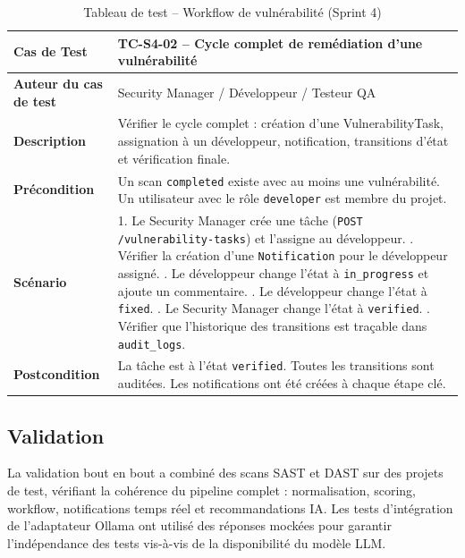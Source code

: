 \begin{table}[H]
\centering
\caption{Tableau de test -- Workflow de vulnérabilité (Sprint 4)}
\label{tab:test-sprint4-workflow}
\small
\renewcommand{\arraystretch}{1.3}
\begin{tabularx}{\textwidth}{>{\bfseries}p{3.5cm} X}
\hline
Cas de Test & TC-S4-02 -- Cycle complet de remédiation d'une vulnérabilité \\
\hline
Auteur du cas de test & Security Manager / Développeur / Testeur QA \\
\hline
Description & Vérifier le cycle complet : création d'une VulnerabilityTask, assignation à un développeur, notification, transitions d'état et vérification finale. \\
\hline
Précondition & Un scan \texttt{completed} existe avec au moins une vulnérabilité. Un utilisateur avec le rôle \texttt{developer} est membre du projet. \\
\hline
Scénario &
1. Le Security Manager crée une tâche (\texttt{POST /vulnerability-tasks}) et l'assigne au développeur. \newline
2. Vérifier la création d'une \texttt{Notification} pour le développeur assigné. \newline
3. Le développeur change l'état à \texttt{in\_progress} et ajoute un commentaire. \newline
4. Le développeur change l'état à \texttt{fixed}. \newline
5. Le Security Manager change l'état à \texttt{verified}. \newline
6. Vérifier que l'historique des transitions est traçable dans \texttt{audit\_logs}. \\
\hline
Postcondition & La tâche est à l'état \texttt{verified}. Toutes les transitions sont auditées. Les notifications ont été créées à chaque étape clé. \\
\hline
\end{tabularx}
\end{table}

\subsection{Validation}
La validation bout en bout a combiné des scans SAST et DAST sur des projets de test, vérifiant la cohérence du pipeline complet : normalisation, scoring, workflow, notifications temps réel et recommandations IA. Les tests d'intégration de l'adaptateur Ollama ont utilisé des réponses mockées pour garantir l'indépendance des tests vis-à-vis de la disponibilité du modèle LLM.

